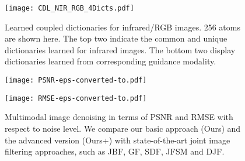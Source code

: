 \documentclass{article}
\begin{document}
%
\begin{figure}[t]
	\centering
	\texttt{[image: CDL\_NIR\_RGB\_4Dicts.pdf]} %
	
	\vspace{-0.2cm}
	
	\caption{Learned coupled dictionaries for infrared/RGB images. 256 atoms are shown here. The top two indicate the common and unique dictionaries learned for infrared images. The bottom two display dictionaries learned from corresponding guidance modality.}
	\label{Fig:LearnedD}
\end{figure}




\begin{figure}[t]
	\centering
	\begin{minipage}[b]{0.48\linewidth}
		\centering
		\texttt{[image: PSNR-eps-converted-to.pdf]} 
	\end{minipage}
	\begin{minipage}[b]{0.48\linewidth}
		\centering
		\texttt{[image: RMSE-eps-converted-to.pdf]}
	\end{minipage}

	\vspace{-0.2cm}
	
	\caption{Multimodal image denoising in terms of PSNR and RMSE with respect to noise level. We compare our basic approach (Ours) and the advanced version (Ours+) with state-of-the-art joint image filtering approaches, such as JBF\cite{kopf2007joint}, GF\cite{he2013guided}, SDF\cite{ham2017robust}, JFSM\cite{shen2015multispectral} and DJF\cite{li2016deep}.}
	\label{Fig:PSNR_RMSE}
\end{figure}
\end{document}
